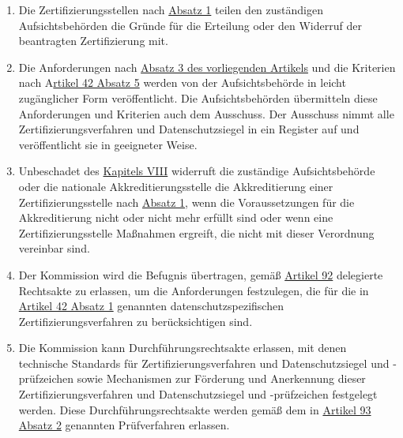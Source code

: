 \begin{enumerate}
  \item Die Zertifizierungsstellen nach \hyperref[itm:43-1]{Absatz 1} teilen den zuständigen Aufsichtsbehörden die
   Gründe für die Erteilung oder den Widerruf der beantragten Zertifizierung mit.
  \label{itm:43-5}

  \item Die Anforderungen nach \hyperref[itm:43-3]{Absatz 3 des vorliegenden Artikels} und die Kriterien nach A\hyperref
   [itm:42-5]{rtikel 42 Absatz 5} werden von der Aufsichtsbehörde in leicht zugänglicher Form veröffentlicht. Die
   Aufsichtsbehörden übermitteln diese Anforderungen und Kriterien auch dem Ausschuss. Der Ausschuss nimmt alle
   Zertifizierungsverfahren und Datenschutzsiegel in ein Register auf und veröffentlicht sie in geeigneter Weise.
  \label{itm:43-6}

  \item Unbeschadet des \hyperref[part:8]{Kapitels VIII} widerruft die zuständige Aufsichtsbehörde oder die nationale
   Akkreditierungsstelle die Akkreditierung einer Zertifizierungsstelle nach \hyperref[itm:43-1]{Absatz 1}, wenn die
   Voraussetzungen für die Akkreditierung nicht oder nicht mehr erfüllt sind oder wenn eine Zertifizierungsstelle
   Maßnahmen ergreift, die nicht mit dieser Verordnung vereinbar sind.
  \label{itm:43-7}

  \item Der Kommission wird die Befugnis übertragen, gemäß \hyperref[ch:92]{Artikel 92} delegierte Rechtsakte zu
   erlassen, um die Anforderungen festzulegen, die für die in \hyperref[itm:42-1]{Artikel 42 Absatz 1} genannten
   datenschutzspezifischen Zertifizierungsverfahren zu berücksichtigen sind.
  \label{itm:43-8}

  \item Die Kommission kann Durchführungsrechtsakte erlassen, mit denen technische Standards für
   Zertifizierungsverfahren und Datenschutzsiegel und -prüfzeichen sowie Mechanismen zur Förderung und Anerkennung
   dieser Zertifizierungsverfahren und Datenschutzsiegel und -prüfzeichen festgelegt werden. Diese
   Durchführungsrechtsakte werden gemäß dem in \hyperref[itm:93-2]{Artikel 93 Absatz 2} genannten Prüfverfahren
   erlassen.
  \label{itm:43-9}

\end{enumerate}


